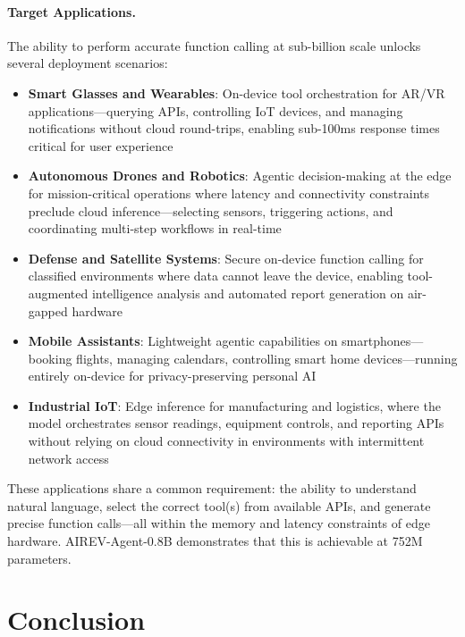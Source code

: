 \documentclass[10pt,twocolumn]{article}
\begin{document}
\paragraph{Target Applications.} The ability to perform accurate function calling at sub-billion scale unlocks several deployment scenarios:

\begin{itemize}[itemsep=1pt]
    \item \textbf{Smart Glasses and Wearables}: On-device tool orchestration for AR/VR applications---querying APIs, controlling IoT devices, and managing notifications without cloud round-trips, enabling sub-100ms response times critical for user experience
    \item \textbf{Autonomous Drones and Robotics}: Agentic decision-making at the edge for mission-critical operations where latency and connectivity constraints preclude cloud inference---selecting sensors, triggering actions, and coordinating multi-step workflows in real-time
    \item \textbf{Defense and Satellite Systems}: Secure on-device function calling for classified environments where data cannot leave the device, enabling tool-augmented intelligence analysis and automated report generation on air-gapped hardware
    \item \textbf{Mobile Assistants}: Lightweight agentic capabilities on smartphones---booking flights, managing calendars, controlling smart home devices---running entirely on-device for privacy-preserving personal AI
    \item \textbf{Industrial IoT}: Edge inference for manufacturing and logistics, where the model orchestrates sensor readings, equipment controls, and reporting APIs without relying on cloud connectivity in environments with intermittent network access
\end{itemize}

These applications share a common requirement: the ability to understand natural language, select the correct tool(s) from available APIs, and generate precise function calls---all within the memory and latency constraints of edge hardware. AIREV-Agent-0.8B demonstrates that this is achievable at 752M parameters.

\section{Conclusion}
\end{document}

